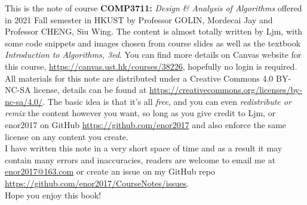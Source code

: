 \documentclass[11pt,fleqn]{book} %
\begin{document}
\noindent This is the note of course {\bf COMP3711:} {\it Design \& Analysis of Algorithms} 
offered in 2021 Fall semester in HKUST by Professor GOLIN, Mordecai Jay
and Professor CHENG, Siu Wing. The content is almost totally written by Ljm, 
with some code snippets and images chosen from course slides as well as the textbook 
{\it Introduction to Algorithms, 3ed}.
You can find more details on Canvas website for this course, \url{https://canvas.ust.hk/courses/38226},
hopefully no login is required.\\

\noindent All materials for this note are distributed under a Creative Commons 4.0 BY-NC-SA 
license, details can be found at \url{https://creativecommons.org/licenses/by-nc-sa/4.0/}. 
The basic idea is that it's all {\it free}, and you can even {\it redistribute or remix} the 
content however you want, so long as you give credit to Ljm, 
or enor2017 on GitHub \url{https://github.com/enor2017} and also enforce the same license 
on any content you create.\\

\noindent I have written this note in a very short space of time and as a 
result it may contain many errors and inaccuracies, 
readers are welcome to email me at \url{enor2017@163.com} or create an issue on my 
GitHub repo \url{https://github.com/enor2017/CourseNotes/issues}.\\

\noindent Hope you enjoy this book!





\pagestyle{empty} %

\tableofcontents %

\cleardoublepage %

\pagestyle{fancy} %

\end{document}
